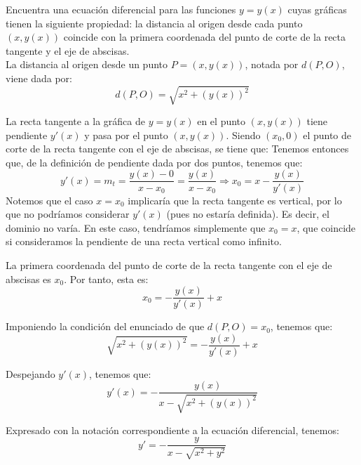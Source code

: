 \documentclass[12pt]{article}
\begin{document}
    \begin{ejercicio}
        Encuentra una ecuación diferencial para las funciones $y=y(x)$ cuyas gráficas tienen la siguiente propiedad:
        la distancia al origen desde cada punto $(x,y(x))$ coincide con la primera coordenada del punto de corte de la recta tangente y el eje de abscisas.\\

        La distancia al origen desde un punto $P=(x,y(x))$, notada por $d(P,O)$, viene dada por:
        \begin{equation*}
            d(P,O) = \sqrt{x^2 + (y(x))^2}
        \end{equation*}

        La recta tangente a la gráfica de $y=y(x)$ en el punto $(x,y(x))$ tiene pendiente $y'(x)$ y pasa por el punto $(x,y(x))$. Siendo $(x_0, 0)$ el punto de corte de la recta tangente con el eje de abscisas, se tiene que:
        Tenemos entonces que, de la definición de pendiente dada por dos puntos, tenemos que:
        \begin{equation*}
            y'(x) = m_t = \dfrac{y(x) - 0}{x - x_0} = \dfrac{y(x)}{x - x_0}
            \Longrightarrow
            x_0 = x - \dfrac{y(x)}{y'(x)}
        \end{equation*}
        Notemos que el caso $x=x_0$ implicaría que la recta tangente es vertical, por lo que no podríamos considerar $y'(x)$ (pues no estaría definida). Es decir, el dominio no varía.
        En este caso, tendríamos simplemente que $x_0=x$, que coincide si consideramos la pendiente de una recta vertical como infinito.

        La primera coordenada del punto de corte de la recta tangente con el eje de abscisas es $x_0$. Por tanto, esta es:
        \begin{equation*}
            x_0 = -\dfrac{y(x)}{y'(x)} +x
        \end{equation*}

        Imponiendo la condición del enunciado de que $d(P,O) = x_0$, tenemos que:
        \begin{equation*}
            \sqrt{x^2 + (y(x))^2} = -\dfrac{y(x)}{y'(x)} +x
        \end{equation*}

        Despejando $y'(x)$, tenemos que:
        \begin{equation*}
            y'(x) = -\dfrac{y(x)}{x - \sqrt{x^2 + (y(x))^2}}
        \end{equation*}

        Expresado con la notación correspondiente a la ecuación diferencial, tenemos:
        \begin{equation*}
            y' = -\dfrac{y}{x - \sqrt{x^2 + y^2}}
        \end{equation*}
    \end{ejercicio}
\end{document}
